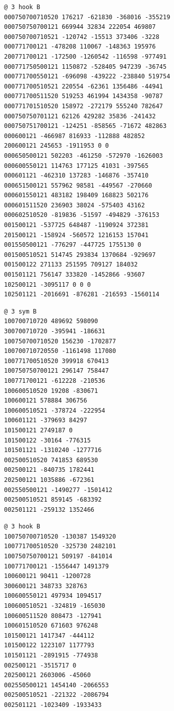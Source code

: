 \begin{Verbatim}[fontsize=\footnotesize]
@ 3 hook B
000750700710520 176217 -621830 -368016 -355219
000750750700121 669944 32834 222054 469807
000750700710521 -120742 -15513 373406 -3228
000771700121 -478208 110067 -148363 195976
200771700121 -172500 -1260542 -116598 -977491
000771750500121 1150872 -528405 947239 -36745
000771700550121 -696098 -439222 -238840 519754
000771700510521 220554 -62361 1356486 -44941
000771700511520 519253 461994 1434358 -90787
000771701510520 158972 -272179 555240 782647
000750750701121 62126 429282 35836 -241432
000750751700121 -124251 -858565 -71672 482863
000600121 -466987 816933 -112888 482852
200600121 245653 -1911953 0 0
000650500121 502203 -461250 -572970 -1626003
000600550121 114763 177125 41031 -397565
000601121 -462310 137283 -146876 -357410
000651500121 557962 98581 -449567 -270660
000601550121 483182 198409 168823 502176
000601511520 236903 38024 -575403 43162
000602510520 -819836 -51597 -494829 -376153
001500121 -537725 648487 -1190924 372381
201500121 -158924 -560572 1216153 157041
001550500121 -776297 -447725 1755130 0
001500510521 514745 293834 1370684 -929697
001500122 271133 251595 709127 184032
001501121 756147 333820 -1452866 -93607
102500121 -3095117 0 0 0
102501121 -2016691 -876281 -216593 -1560114
\end{Verbatim}
\begin{Verbatim}[fontsize=\footnotesize]
@ 3 sym B
100700710720 489692 598090
300700710720 -395941 -186631
100750700710520 156230 -1702877
100700710720550 -1161498 117080
100771700510520 399918 670413
100750750700121 296147 758447
100771700121 -612228 -210536
100600510520 19208 -830671
100600121 578884 306756
100600510521 -378724 -222954
100601121 -379693 84297
101500121 2749187 0
101500122 -30164 -776315
101501121 -1310240 -1277716
002500510520 741853 689530
002500121 -840735 1782441
202500121 1035886 -672361
002550500121 -1490277 -1501412
002500510521 859145 -683392
002501121 -259132 1352466
\end{Verbatim}
\begin{Verbatim}[fontsize=\footnotesize]
@ 3 hook B
100750700710520 -130387 1549320
100771700510520 -325730 2482101
100750750700121 509197 -841014
100771700121 -1556447 1491379
100600121 90411 -1200728
300600121 348733 328763
100600550121 497934 1094517
100600510521 -324819 -165030
100600511520 808473 -127941
100601510520 671603 976248
101500121 1417347 -444112
101500122 1223107 1177793
101501121 -2891915 -774938
002500121 -3515717 0
202500121 2603006 -45060
002550500121 1454140 -2066553
002500510521 -221322 -2086794
002501121 -1023409 -1933433
\end{Verbatim}
